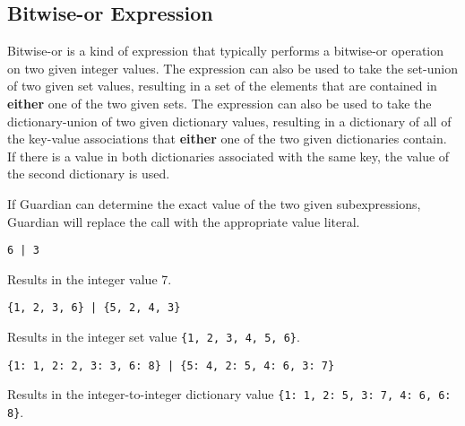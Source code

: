 
\subsection{Bitwise-or Expression}
{
	Bitwise-or is a kind of expression that typically performs
	a bitwise-or operation on two given integer values.
	The expression can also be used to take the set-union
	of two given set values, resulting in a set of the
	elements that are contained in
	\textbf{either} one of the two given sets.
	The expression can also be used to take the
	dictionary-union of two given
	dictionary values, resulting in a dictionary of
	all of the key-value
	associations that \textbf{either} one of the two given
	dictionaries contain. If there is a value in both dictionaries
	associated with the same key, the value of the second dictionary is used.
	
	If Guardian can determine the exact value of the two given subexpressions,
	Guardian will replace the call with the appropriate value literal.
	
	\begin{itemize}
	{
		\item[] \lstinline[language=MAIA, columns=fixed]@6 | 3@
		
			Results in the integer value 7.
		
		\item[] \lstinline[language=MAIA, columns=fixed]@{1, 2, 3, 6} | {5, 2, 4, 3}@
		
			Results in the integer set value \lstinline[language=MAIA, columns=fixed]@{1, 2, 3, 4, 5, 6}@.
		
		\item[] \lstinline[language=MAIA, columns=fixed]@{1: 1, 2: 2, 3: 3, 6: 8} | {5: 4, 2: 5, 4: 6, 3: 7}@
		
			Results in the integer-to-integer dictionary
			value \lstinline[language=MAIA, columns=fixed]@{1: 1, 2: 5, 3: 7, 4: 6, 6: 8}@.
	}
	\end{itemize}
}
